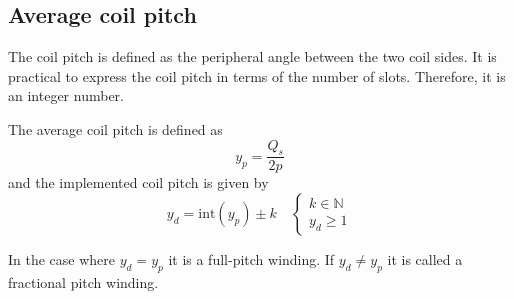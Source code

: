 \subsection{Average coil pitch}
The coil pitch is defined as the peripheral angle between the two coil sides. It is practical to express the coil pitch in terms of the number of slots. Therefore, it is an integer number. 
\begin{defth}
The average coil pitch is defined as
\begin{equation}
  \label{eqn:y_p}
  y_p = \frac{Q_s}{2p}
\end{equation}
and the implemented coil pitch is given by
\begin{equation}
  \label{eqn:y_d}
  y_d = \mbox{int}(y_p)\pm k
  \quad
  \begin{cases}
    k \in \mathbb{N} \\
    y_d \geq 1
  \end{cases}
\end{equation}
\end{defth}
In the case where $y_d=y_p$ it is a full-pitch winding. If $y_d \neq y_p$ it is called a fractional pitch winding. 
 
